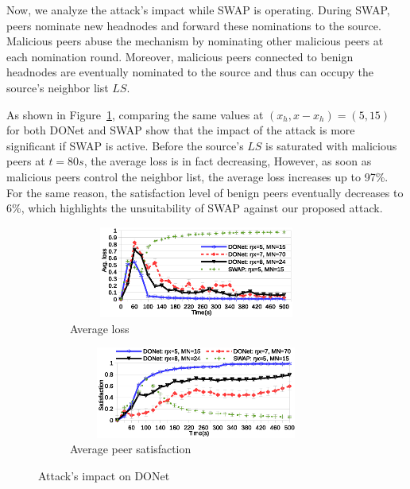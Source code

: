 Now, we analyze the attack's impact while SWAP is operating.
During SWAP, peers nominate new headnodes and forward these nominations to the source. 
Malicious peers abuse the mechanism by nominating other malicious peers at each nomination round. 
Moreover, malicious peers connected to benign headnodes are eventually nominated to the source and thus can occupy the source's neighbor list $LS$. 

As shown in Figure~\ref{subfig:avg-loss-donet}, comparing the same values at $(x_h, x-x_h)=(5, 15)$ for both DONet and SWAP show that the impact of the attack is more significant if SWAP is active.
Before the source's $LS$ is saturated with malicious peers at $t=80s$, the average loss is in fact decreasing, However, as soon as malicious peers control the neighbor list, the average loss increases up to 97\%. 
For the same reason, the satisfaction level of benign peers eventually decreases to 6\%, which highlights the unsuitability of SWAP against our proposed attack.




\begin{figure}[tb]
  \centering
  \begin{subfigure}[c]{0.95\columnwidth}
    \centering
    \includegraphics[width=8.4cm,height=3cm]{./Figures/avg-loss-donet.eps}
    \caption{Average loss}%
    \label{subfig:avg-loss-donet}
  \end{subfigure}
  \begin{subfigure}[c]{0.95\columnwidth}
    \centering
    \includegraphics[width=8.4cm,height=3cm]{./Figures/satisfaction-donet.eps}
    \caption{Average peer satisfaction}%
    \label{subfig:satisfaction-donet}
  \end{subfigure}
  \caption{Attack's impact on DONet}%
  \label{fig:attack-results}
  \vspace{-4mm}
\end{figure}

